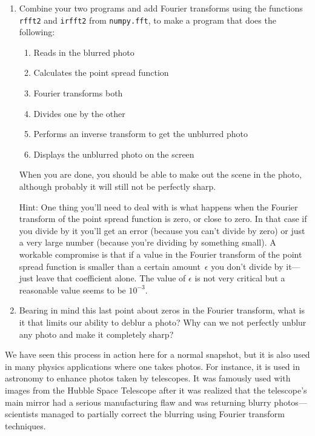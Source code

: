 \documentclass[12pt]{article}
\begin{document}
\begin{exercises}
\begin{enumerate}
\item Combine your two programs and add Fourier transforms using the
  functions \verb|rfft2| and \verb|irfft2| from \verb|numpy.fft|, to make a
  program that does the following:
  {\renewcommand{\labelenumii}{\roman{enumii})\ }
\begin{enumerate}\setlength{\itemsep}{0pt}\setlength{\parskip}{0pt}
\item Reads in the blurred photo
\item Calculates the point spread function
\item Fourier transforms both
\item Divides one by the other
\item Performs an inverse transform to get the unblurred photo
\item Displays the unblurred photo on the screen
\end{enumerate}}
\noindent When you are done, you should be able to make out the scene in
the photo, although probably it will still not be perfectly sharp.

Hint: One thing you'll need to deal with is what happens when the Fourier
transform of the point spread function is zero, or close to zero.  In that
case if you divide by it you'll get an error (because you can't divide by
zero) or just a very large number (because you're dividing by something
small).  A workable compromise is that if a value in the Fourier transform
of the point spread function is smaller than a certain amount~$\epsilon$
you don't divide by it---just leave that coefficient alone.  The value of
$\epsilon$ is not very critical but a reasonable value seems to be $10^{-3}$.
\item Bearing in mind this last point about zeros in the Fourier transform,
  what is it that limits our ability to deblur a photo?  Why can we not
  perfectly unblur any photo and make it completely sharp?
\end{enumerate}

We have seen this process in action here for a normal snapshot, but it is
also used in many physics applications where one takes photos.  For
instance, it is used in astronomy to enhance photos taken by telescopes.
It was famously used with images from the Hubble Space Telescope
after it was realized that the telescope's main mirror had a serious
manufacturing flaw and was returning blurry photos---scientists managed to
partially correct the blurring using Fourier transform techniques.

\end{exercises}
\end{document}
